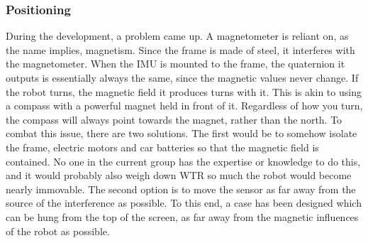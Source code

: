 \subsubsection{Positioning}
During the development, a problem came up.
A magnetometer is reliant on, as the name implies, magnetism.
Since the frame is made of steel, it interferes with the magnetometer.
When the IMU is mounted to the frame, the quaternion it outputs is essentially always the same, since the magnetic values never change.
If the robot turns, the magnetic field it produces turns with it.
This is akin to using a compass with a powerful magnet held in front of it.
Regardless of how you turn, the compass will always point towards the magnet, rather than the north.
To combat this issue, there are two solutions.
The first would be to somehow isolate the frame, electric motors and car batteries so that the magnetic field is contained.
No one in the current group has the expertise or knowledge to do this, and it would probably also weigh down WTR so much the robot would become nearly immovable.
The second option is to move the sensor as far away from the source of the interference as possible.
To this end, a case has been designed which can be hung from the top of the screen, as far away from the magnetic influences of the robot as possible.

\newpage    
    